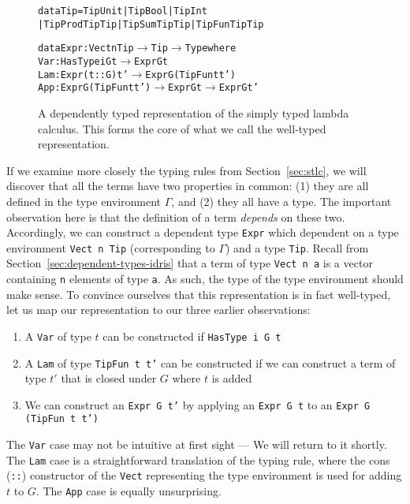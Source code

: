 \begin{figure}
\begin{alltt}
  data Tip = TipUnit | TipBool | TipInt 
           | TipProd Tip Tip | TipSum Tip Tip | TipFun Tip Tip

  data Expr : Vect n Tip \(\rightarrow\) Tip \(\rightarrow\) Type where
    Var : HasType i G t \(\rightarrow\) Expr G t
    Lam : Expr (t :: G) t' \(\rightarrow\) Expr G (TipFun t t')
    App : Expr G (TipFun t t') \(\rightarrow\) Expr G t \(\rightarrow\) Expr G t'
\end{alltt}
\caption{A dependently typed representation of the simply typed lambda calculus. This forms the core of what we call the well-typed representation.}
\label{fig:well-typed-stlc}
\end{figure}

If we examine more closely the typing rules from Section~\ref{sec:stlc}, we will discover that all the terms have two properties in common: (1) they are all defined in the type environment $\Gamma$, and (2) they all have a type. The important observation here is that the definition of a term \emph{depends} on these two. Accordingly, we can construct a dependent type \texttt{Expr} which dependent on a type environment \texttt{Vect n Tip} (corresponding to $\Gamma$) and a type \texttt{Tip}. Recall from Section~\ref{sec:dependent-types-idris} that a term of type \texttt{Vect n a} is a vector containing \texttt{n} elements of type \texttt{a}. As such, the type of the type environment should make sense. To convince ourselves that this representation is in fact well-typed, let us map our representation to our three earlier observations:

\begin{enumerate}
\item A \texttt{Var} of type $t$ can be constructed if \texttt{HasType i G t}
\item A \texttt{Lam} of type \texttt{TipFun t t'} can be constructed if we can construct a term of type $t'$ that is closed under $G$ where $t$ is added
\item We can construct an \texttt{Expr G t'} by applying an \texttt{Expr G t} to an \texttt{Expr G (TipFun t t')}
\end{enumerate}

The \texttt{Var} case may not be intuitive at first sight --- We will return to it shortly. The \texttt{Lam} case is a straightforward translation of the typing rule, where the cons (\texttt{::}) constructor of the \texttt{Vect} representing the type environment is used for adding $t$ to $G$. The \texttt{App} case is equally unsurprising.

